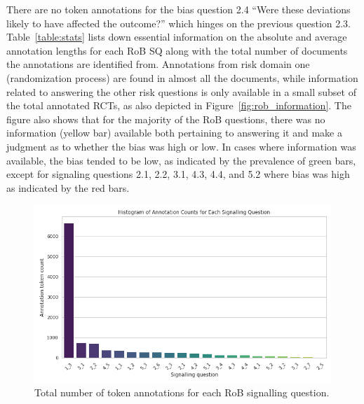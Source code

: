 \documentclass[sn-mathphys,Numbered]{sn-jnl}%
\theoremstyle{thmstyleone}%
\theoremstyle{thmstyletwo}%
\theoremstyle{thmstylethree}%
\begin{document}
 
There are no token annotations for the bias question 2.4 ``Were these deviations likely to have affected the outcome?'' which hinges on the previous question 2.3.
Table~\ref{table:stats} lists down essential information on the absolute and average annotation lengths for each RoB SQ along with the total number of documents the annotations are identified from.
Annotations from risk domain one (randomization process) are found in almost all the documents, while information related to answering the other risk questions is only available in a small subset of the total annotated RCTs, as also depicted in Figure~\ref{fig:rob_information}.
The figure also shows that for the majority of the RoB questions, there was no information (yellow bar) available both pertaining to answering it and make a judgment as to whether the bias was high or low.
In cases where information was available, the bias tended to be low, as indicated by the prevalence of green bars, except for signaling questions 2.1, 2.2, 3.1, 4.3, 4.4, and 5.2 where bias was high as indicated by the red bars.
%
%
%
\begin{figure}[htb]
    \centering
    \includegraphics[width=0.60\columnwidth]{figures/sq_ann_raw_counts.png}
    \caption{Total number of token annotations for each RoB signalling question.}
    \label{fig:ann_counts}
\end{figure}
%
%
%
\end{document}
